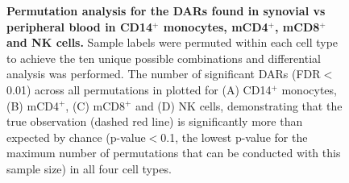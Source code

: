 \begin{figure}[htbp]
\begin{subfigure}[b]{0.45\textwidth}
\caption{}
\end{subfigure}
\caption[Permutation analysis for the DARs found in synovial vs peripheral blood in CD14$^+$ monocytes, mCD4$^+$, mCD8$^+$ and NK cells.]{\textbf{Permutation analysis for the DARs found in synovial vs peripheral blood in CD14$^+$ monocytes, mCD4$^+$, mCD8$^+$ and NK cells.} Sample labels were permuted within each cell type to achieve the ten unique possible combinations and differential analysis was performed. The number of significant DARs (FDR$<$0.01) across all permutations in plotted for (A) CD14$^+$ monocytes, (B) mCD4$^+$, (C) mCD8$^+$ and (D) NK cells, demonstrating that the true observation (dashed red line) is significantly more than expected by chance (p-value$<$0.1, the lowest p-value for the maximum number of permutations that can be conducted with this sample size) in all four cell types.}
\label{figure:PsA_perm_analysis}
\end{figure}


